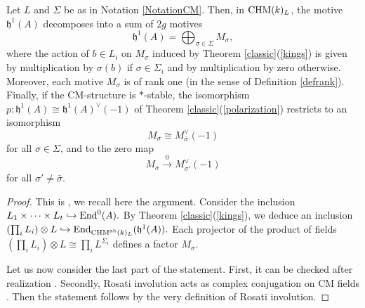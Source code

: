 \documentclass[11pt]{amsart}
\begin{document}
\begin{prop}\label{decomposition}
Let $L$ and   $\Sigma$ be as in Notation  \ref{NotationCM}. Then, in $\mathrm{CHM} (k)_{L}$, the motive $\mathfrak{h}^1(A)$ decomposes into a sum of $2g$ motives  
\[\mathfrak{h}^1(A) =\bigoplus_{\sigma \in \Sigma} M_\sigma,\]
where the action of $b\in L_i$ on $M_\sigma$ induced by Theorem \ref{classic}(\ref{kings}) is given by multiplication by $\sigma(b)$ if $\sigma \in \Sigma_i$ and by multiplication by zero otherwise.  Moreover, each motive $ M_\sigma$ is of rank one (in the sense of Definition \ref{defrank}). Finally, if the CM-structure is $*$-stable, the isomorphism $p:  \mathfrak{h}^1(A)\cong\mathfrak{h}^1(A)^{\vee}(-1)$ of Theorem \ref{classic}(\ref{polarization}) restricts to an isomorphism \[M_\sigma\cong M_{\bar{\sigma}}^\vee(-1)\] for all $\sigma\in \Sigma$, and to the zero map 
\[ M_\sigma \stackrel{0}{\longrightarrow} M_{\sigma'}^\vee(-1) \]
for all $\sigma'\neq {\bar{\sigma}}$.
\end{prop}
\begin{proof}
This is \cite[Corollary 3.2]{Ascona}, we recall here the argument. Consider the inclusion $L_1\times \cdots\times L_t  \hookrightarrow  \textnormal{End}^0(A).$ By Theorem \ref{classic}(\ref{kings}), we deduce an inclusion $(\prod_i L_i)\otimes L  \hookrightarrow  \textnormal{End}_{\mathrm{CHM}^{\mathrm{ab}}(k)_{L}}(\mathfrak{h}^1(A)).$ Each projector of the product of fields $(\prod_i L_i)\otimes L \cong \prod_i L^{\Sigma_i}$ defines a factor $M_{\sigma}.$

Let us now consider the last part of the statement. First, it can be checked after realization   \cite[Corollary 1.12]{Ascona}. Secondly, Rosati involution acts as  complex conjugation on CM fields  \cite[pp. 211-212]{MumfordTata}. Then the statement follows by the very definition of Rosati involution.\end{proof}

\end{document}
